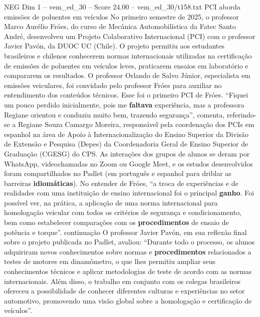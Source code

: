 \begin{textsample}{NEG Dim 1 – vem\_ed\_30 – Score 24.00 – vem\_ed\_30/t158.txt}  \label{ex:f1_neg_163}
PCI aborda emissões de poluentes em veículos No primeiro semestre de 2025, o professor Marco Aurélio Fróes, do curso de Mecânica Automobilística da Fatec Santo André, desenvolveu um Projeto Colaborativo Internacional (PCI) com o professor Javier Pavón, da DUOC UC (Chile).
O projeto permitiu aos estudantes brasileiros e chilenos conhecerem normas internacionais utilizadas na certificação de emissões de poluentes em veículos leves, praticarem ensaios em laboratório e compararem os resultados.
O professor Orlando de Salvo Júnior, especialista em emissões veiculares, foi convidado pelo professor Fróes para auxiliar no entendimento dos conteúdos técnicos.
Esse foi o primeiro PCI de Fróes. “Fiquei um pouco perdido inicialmente, pois me \textbf{faltava} experiência, mas a professora Regiane orientou e conduziu muito bem, trazendo segurança”, comenta, referindo-se a Regiane Souza Camargo Moreira, responsável pela coordenação dos PCIs em espanhol na área de Apoio à Internacionalização do Ensino Superior da Divisão de Extensão e Pesquisa (Depes) da Coordenadoria Geral de Ensino Superior de Graduação (CGESG) do CPS.
As interações dos grupos de alunos se deram por WhatsApp, videochamadas no Zoom ou Google Meet, e os estudos desenvolvidos foram compartilhados no Padlet (em português e espanhol para driblar as barreiras \textbf{idiomáticas}).
No entender de Fróes, “a troca de experiências e de realidades com uma instituição de ensino internacional foi o principal \textbf{ganho}.
Foi possível ver, na prática, a aplicação de uma norma internacional para homologação veicular com todos os critérios de segurança e condicionamento, bem como estabelecer comparações com os \textbf{procedimentos} de ensaio de potência e torque”. continuação O professor Javier Pavón, em sua reflexão final sobre o projeto publicada no Padlet, avaliou: “Durante todo o processo, os alunos adquiriram novos conhecimentos sobre normas e \textbf{procedimentos} relacionados a testes de motores em dinamômetro, o que lhes permitiu ampliar seus conhecimentos técnicos e aplicar metodologias de teste de acordo com as normas internacionais.
Além disso, o trabalho em conjunto com os colegas brasileiros ofereceu a possibilidade de conhecer diferentes culturas e experiências no setor automotivo, promovendo uma visão global sobre a homologação e certificação de veículos”.

\end{textsample}

